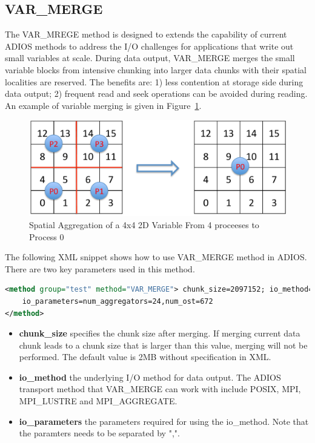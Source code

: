 \subsection{VAR\_MERGE}
\label{section-method-varmerge}
The VAR\_MREGE method is designed to extends the capability of current ADIOS
methods to address the I/O challenges for applications
that write out small variables at scale. During data output, 
VAR\_MERGE merges the small variable blocks from intensive chunking into
larger data chunks with their spatial localities are reserved. The benefits
are: 1) less contention at storage side during data
output; 2) frequent read and seek operations can be avoided during reading.
An example of variable merging is given in Figure~\ref{fig:sar}. 


\begin{figure}[htbp]
\begin{center}
\includegraphics[width=0.5\columnwidth]{figures/sar.pdf}
\caption{Spatial Aggregation of a 4x4 2D Variable From 4 proceeses to Process 0}
\label{fig:sar}
\end{center}
\end{figure}


The following XML snippet shows how to use VAR\_MERGE method in ADIOS.
There are two key parameters used in this method.

\begin{lstlisting}[language=XML]
<method group="test" method="VAR_MERGE"> chunk_size=2097152; io_method=MPI_AGGREGATE; 
    io_parameters=num_aggregators=24,num_ost=672
</method>
\end{lstlisting}

\begin{itemize}
\item \textbf{chunk\_size} specifies the chunk size after merging. If
merging current data chunk leads to a chunk size that is larger than this
value, merging will not be performed. The default value is 2MB without  
specification in XML.  

\item \textbf{io\_method} the underlying I/O method for data output.  
The ADIOS transport method that VAR\_MERGE can work with include POSIX, MPI,
    MPI\_LUSTRE and MPI\_AGGREGATE. 

\item \textbf{io\_parameters} the parameters required for using the
io\_method. Note that the paramters needs to be separated by ",".  
\end{itemize}

